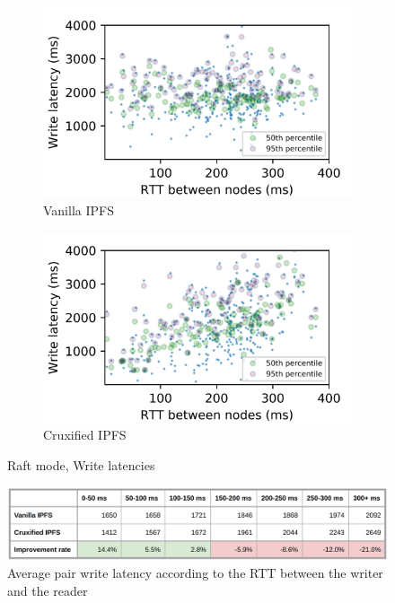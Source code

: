 \documentclass[a4paper,11pt,oneside]{report}
\begin{document}
\begin{figure}[htbp!]
\centering
\begin{subfigure}{.5\textwidth}
  \centering
  \includegraphics[width=1\linewidth]{graphs/plot_write_vanilla_crdt.png}
  \caption{Vanilla IPFS}
  \label{fig:write1}
\end{subfigure}%
\begin{subfigure}{.5\textwidth}
  \centering
  \includegraphics[width=1\linewidth]{graphs/plot_write_cruxified_crdt.png}
  \caption{Cruxified IPFS}
  \label{fig:write2}
\end{subfigure}

\caption{Raft mode, Write latencies}
\label{fig:write}
\end{figure}

\begin{figure}[h!]
  \centering
  \includegraphics[width=1\linewidth]{tables/write.png}
  \caption{Average pair write latency according to the RTT between the writer and the reader}
  \label{tab:w}
\end{figure}
\end{document}

